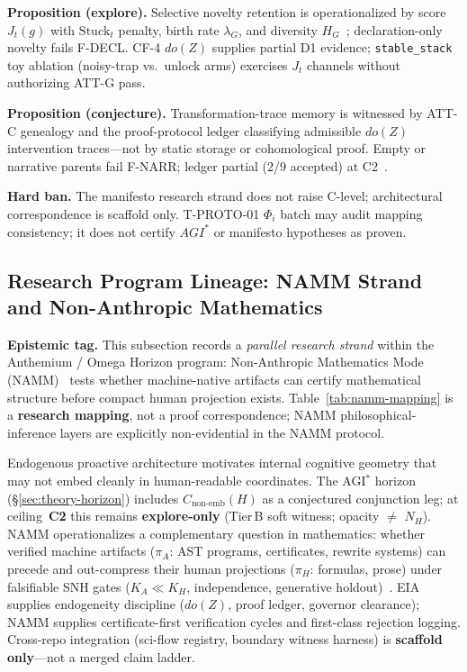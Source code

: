 \documentclass[11pt,a4paper]{article}
\theoremstyle{definition}
\begin{document}
\textbf{Proposition (explore).} Selective novelty retention is operationalized by score $J_t(g)$ with $\mathrm{Stuck}_t$ penalty, birth rate $\lambda_G$, and diversity $H_G$~\cite{kuznetsov2026stable}; declaration-only novelty fails F-DECL. CF-4 $do(Z)$ supplies partial D1 evidence; \texttt{stable\_stack} toy ablation (noisy-trap vs.\ unlock arms) exercises $J_t$ channels without authorizing ATT-G pass.

\textbf{Proposition (conjecture).} Transformation-trace memory is witnessed by ATT-C genealogy and the proof-protocol ledger classifying admissible $do(Z)$ intervention traces---not by static storage or cohomological proof. Empty or narrative parents fail F-NARR; ledger partial (2/9 accepted) at C2~\cite{kuznetsov2026proof}.

\textbf{Hard ban.} The manifesto research strand does not raise C-level; architectural correspondence is scaffold only. T-PROTO-01 $\Phi_i$ batch may audit mapping consistency; it does not certify $AGI^{*}$ or manifesto hypotheses as proven.

\subsection{Research Program Lineage: NAMM Strand and Non-Anthropic Mathematics}\label{sec:namm-lineage}

\textbf{Epistemic tag.} This subsection records a \emph{parallel research strand} within the Anthemium / Omega Horizon program: Non-Anthropic Mathematics Mode (NAMM)~\cite{kuznetsov2026namm} tests whether machine-native artifacts can certify mathematical structure before compact human projection exists. Table~\ref{tab:namm-mapping} is a \textbf{research mapping}, not a proof correspondence; NAMM philosophical-inference layers are explicitly non-evidential in the NAMM protocol.

Endogenous proactive architecture motivates internal cognitive geometry that may not embed cleanly in human-readable coordinates. The AGI$^{*}$ horizon (\S\ref{sec:theory-horizon}) includes $C_{\mathrm{non\text{-}emb}}(H)$ as a conjectured conjunction leg; at ceiling~\textbf{C2} this remains \textbf{explore-only} (Tier\,B soft witness; opacity $\neq$ $N_H$). NAMM operationalizes a complementary question in mathematics: whether verified machine artifacts ($\pi_A$: AST programs, certificates, rewrite systems) can precede and out-compress their human projections ($\pi_H$: formulas, prose) under falsifiable SNH gates ($K_A \ll K_H$, independence, generative holdout)~\cite{kuznetsov2026namm}. EIA supplies endogeneity discipline ($do(Z)$, proof ledger, governor clearance); NAMM supplies certificate-first verification cycles and first-class rejection logging. Cross-repo integration (sci-flow registry, boundary witness harness) is \textbf{scaffold only}---not a merged claim ladder.
\end{document}
